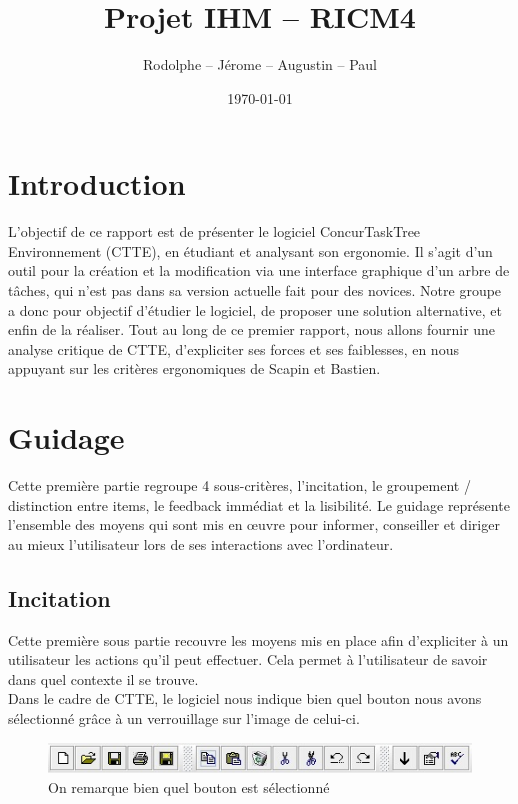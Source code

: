 \documentclass[12pt, a4paper]{article}
\title{Projet IHM -- RICM4}
\author{\bsc{Fréby} Rodolphe -- \bsc{Barbier} Jérome -- \bsc{Husson} Augustin -- \bsc{Labat} Paul}
\date{\today}
\begin{document}
\maketitle
\tableofcontents
\newpage

\section{Introduction}
L'objectif de ce rapport est de présenter le logiciel ConcurTaskTree Environnement (CTTE), en étudiant et analysant son ergonomie. Il s'agit d'un outil pour la création et la modification via une interface graphique d'un arbre de tâches, qui n'est pas dans sa version actuelle fait pour des novices. Notre groupe a donc pour objectif d'étudier le logiciel, de proposer une solution alternative, et enfin de la réaliser. Tout au long de ce premier rapport, nous allons fournir une analyse critique de CTTE, d'expliciter ses forces et ses faiblesses, en nous appuyant sur les critères ergonomiques de Scapin et Bastien.  

\section{Guidage}
Cette première partie regroupe 4 sous-critères, l'incitation, le groupement / distinction entre items, le feedback immédiat et la lisibilité. Le guidage représente l'ensemble des moyens qui sont mis en œuvre pour informer, conseiller et diriger au mieux l'utilisateur lors de ses interactions avec l'ordinateur. 

\subsection{Incitation}
Cette première sous partie recouvre les moyens mis en place afin d'expliciter à un utilisateur les actions qu'il peut effectuer. Cela permet à l'utilisateur de savoir dans quel contexte il se trouve.\\

Dans le cadre de CTTE, le logiciel nous indique bien quel bouton nous avons sélectionné grâce à un verrouillage sur l'image de celui-ci. 


\begin{figure}[h]
\begin{center}
   \includegraphics{incitation.jpg}
	\caption{On remarque bien quel bouton est sélectionné}
	\end{center}
\end{figure}
\end{document}

